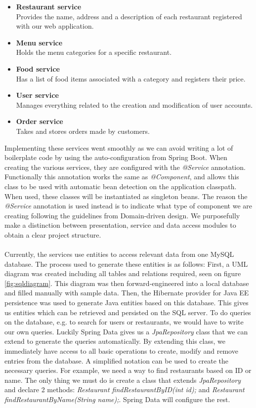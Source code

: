 \documentclass[12pt]{article}
\begin{document}
\begin{multicols}{2}
\begin{itemize}
	\raggedright
	\item \textbf{Restaurant service}\\Provides the name, address and a description of each restaurant registered with our web application.
	\item \textbf{Menu service}\\Holds the menu categories for a specific restaurant.
	\item \textbf{Food service}\\Has a list of food items associated with a category and registers their price.
	\item \textbf{User service}\\Manages everything related to the creation and modification of user accounts.
	\item \textbf{Order service}\\Takes and stores orders made by customers.
\end{itemize} 
Implementing these services went smoothly as we can avoid writing a lot of boilerplate code by using the auto-configuration from Spring Boot. When creating the various services, they are configured with the \textit{@Service} annotation. Functionally this annotation works the same as \textit{@Component}, and allows this class to be used with automatic bean detection on the application classpath. When used, these classes will be instantiated as singleton beans. The reason the \textit{@Service} annotation is used instead is to indicate what type of component we are creating following the guidelines from Domain-driven design. \cite{ComponentAnnotationDifferences34:online} \cite{ServiceAnnotationSpring48:online} We purposefully make a distinction between presentation, service and data access modules to obtain a clear project structure.
\\\\
Currently, the services use entities to access relevant data from one MySQL database. The process used to generate these entities is as follows: First, a UML diagram was created including all tables and relations required, seen on figure \ref{fig:sqldiagram}. This diagram was then forward-engineered into a local database and filled manually with sample data. Then, the Hibernate provider for Java EE persistence was used to generate Java entities based on this database. This gives us entities which can be retrieved and persisted on the SQL server. To do queries on the database, e.g. to search for users or restaurants, we would have to write our own queries. Luckily Spring Data gives us a \textit{JpaRepository} class that we can extend to generate the queries automatically. By extending this class, we immediately have access to all basic operations to create, modify and remove entries from the database. A simplified notation can be used to create the necessary queries. For example, we need a way to find restaurants based on ID or name. The only thing we must do is create a class that extends \textit{JpaRepository} and declare 2 methods: \textit{Restaurant findRestaurantByID(int id);} and \textit{Restaurant findRestaurantByName(String name);}. Spring Data will configure the rest.

\end{multicols}
\end{document}
